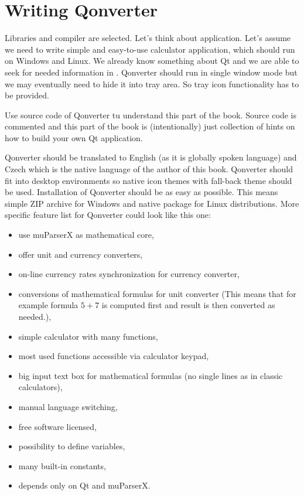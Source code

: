 \chapter{Writing Qonverter}
Libraries and compiler are selected. Let's think about application. Let's assume we need to write simple and easy-to-use calculator application, which should run on Windows and Linux. We already know something about Qt and we are able to seek for needed information in \citep{various:qtdoc}. Qonverter should run in single window mode but we may eventually need to hide it into tray area. So tray icon functionality has to be provided.

\begin{fdocextra}
Use source code of Qonverter tu understand this part of the book. Source code is commented and this part of the book is (intentionally) just collection of hints on how to build your own Qt application.
\end{fdocextra}

Qonverter should be translated to English (as it is globally spoken language) and Czech which is the native language of the author of this book. Qonverter should fit into desktop environments so native icon themes with fall-back theme should be used. Installation of Qonverter should be as easy as possible. This means simple ZIP archive for Windows and native package for Linux distributions. More specific feature list for Qonverter could look like this one:
\begin{itemize}
\item use muParserX as mathematical core,
\item offer unit and currency converters,
\item on-line currency rates synchronization for currency converter,
\item conversions of mathematical formulas for unit converter (This means that for example formula $5+7$ is computed first and result is then converted as needed.),
\item simple calculator with many functions,
\item most used functions accessible via calculator keypad,
\item big input text box for mathematical formulas (no single lines as in classic calculators),
\item manual language switching,
\item free software licensed,
\item possibility to define variables,
\item many built-in constants,
\item depends only on Qt and muParserX.
\end{itemize}

